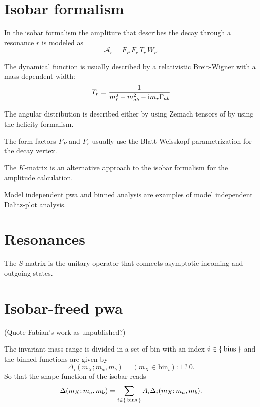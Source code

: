 \documentclass[
	fontsize=10pt,
	open=right,
	twoside,
    english,
    draft,
]{scrbook}
\newcommand{\A}{\ensuremath{\mathcal{A}}}
\begin{document}
    \section{Isobar formalism}

    In the isobar formalism the ampliture that describes the decay through a resonance $r$ is modeled as
    \begin{equation}
        \A_r = F_P\,F_r\, T_r\, W_r.
    \end{equation}

    The dynamical function is usually described by a relativistic Breit-Wigner with a mass-dependent width:
    \begin{equation}
        T_r = \frac{1}{m_r^2 - m_{ab}^2 - \mathrm{i} m_r \Gamma_{ab}}
    \end{equation}

    The angular distribution is described either by using Zemach tensors of by using the helicity formalism.


    The form factors $F_P$ and $F_r$ usually use the Blatt-Weisskopf parametrization for the decay vertex.


    The $K$-matrix is an alternative approach to the isobar formalism for the amplitude calculation.


    Model independent \gls{pwa} and binned analysis are examples of model independent Dalitz-plot analysis.


    \section{Resonances}

    The $S$-matrix is the unitary operator that connects asymptotic incoming and outgoing states.


    \section{Isobar-freed \gls{pwa}}


    (Quote Fabian's work as unpublished?)


    The invariant-mass range is divided in a set of bin with an index $i \in \Set{ \text{bins} }$ and the binned functions are given by
    \begin{equation}
        \Delta_i(m_X; m_a, m_b) = ( m_X \in \text{bin}_i) : 1\  ?\  0.
    \end{equation}
    So that the shape function of the isobar reads
    \begin{equation}
        \Delta(m_X; m_a, m_b) = \sum_{i\in \Set{\text{bins}}} A_i \Delta_i(m_X;m_a, m_b).
    \end{equation}
\end{document}
